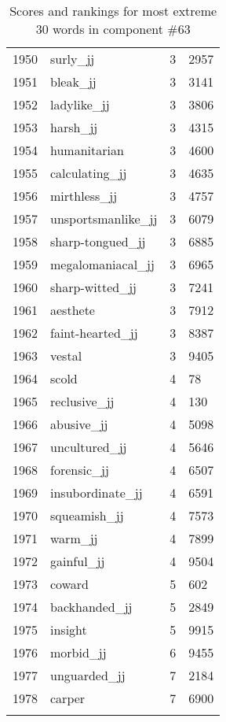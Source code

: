 \begin{longtable}[!htbp]{| rlr@{.}l |}
    1950 & surly\_jj & 3 & 2957 \\
    1951 & bleak\_jj & 3 & 3141 \\
    1952 & ladylike\_jj & 3 & 3806 \\
    1953 & harsh\_jj & 3 & 4315 \\
    1954 & humanitarian & 3 & 4600 \\
    1955 & calculating\_jj & 3 & 4635 \\
    1956 & mirthless\_jj & 3 & 4757 \\
    1957 & unsportsmanlike\_jj & 3 & 6079 \\
    1958 & sharp-tongued\_jj & 3 & 6885 \\
    1959 & megalomaniacal\_jj & 3 & 6965 \\
    1960 & sharp-witted\_jj & 3 & 7241 \\
    1961 & aesthete & 3 & 7912 \\
    1962 & faint-hearted\_jj & 3 & 8387 \\
    1963 & vestal & 3 & 9405 \\
    1964 & scold & 4 & 78 \\
    1965 & reclusive\_jj & 4 & 130 \\
    1966 & abusive\_jj & 4 & 5098 \\
    1967 & uncultured\_jj & 4 & 5646 \\
    1968 & forensic\_jj & 4 & 6507 \\
    1969 & insubordinate\_jj & 4 & 6591 \\
    1970 & squeamish\_jj & 4 & 7573 \\
    1971 & warm\_jj & 4 & 7899 \\
    1972 & gainful\_jj & 4 & 9504 \\
    1973 & coward & 5 & 602 \\
    1974 & backhanded\_jj & 5 & 2849 \\
    1975 & insight & 5 & 9915 \\
    1976 & morbid\_jj & 6 & 9455 \\
    1977 & unguarded\_jj & 7 & 2184 \\
    1978 & carper & 7 & 6900 \\
    \hline
    \caption{Scores and rankings for most extreme 30 words in component \#63} \\
\end{longtable}
